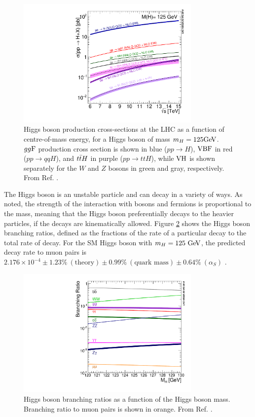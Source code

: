 \begin{figure}[h]
  \centering
  \includegraphics[width=0.8\textwidth]{figures/theory/HiggsProduction}
  \caption[Higgs boson production cross-sections at the LHC.]{Higgs boson production
  cross-sections at the LHC as a function of centre-of-mass energy, for a Higgs boson
  of mass $m_H = 125 \text{Ge\kern -0.1em V}$. $gg\text{F}$ production cross section is shown in blue
  ($pp \rightarrow H$), $\text{VBF}$ in red ($pp \rightarrow qqH$), and $t\bar{t} H$ in purple
  ($pp \rightarrow ttH$), while $\text{VH}$ is shown separately for the $W$ and $Z$ bosons
  in green and gray, respectively. From Ref. \cite{deFlorian:2016spz}.}
   \label{fig:the:prod}
\end{figure}

The Higgs boson is an unstable particle and can decay in a variety of ways. As noted,
the strength of the interaction with bosons and fermions is proportional to the mass,
meaning that the Higgs boson preferentially decays to the heavier particles, if the decays
are kinematically allowed. Figure \ref{fig:the:decay} shows the Higgs boson branching
ratios, defined as the fractions of the rate of a particular decay to the total
rate of decay. For the SM Higgs boson with $m_H = 125~\text{Ge\kern -0.1em V}$, the predicted decay rate to muon pairs
is $2.176 \times 10^{-4}
\pm 1.23\%~(\text{theory})
\pm 0.99\%~(\text{quark mass})
\pm 0.64\%~(\alpha_S)$ \cite{deFlorian:2016spz}. 

\begin{figure}[h]
  \centering
  \includegraphics[width=0.8\textwidth]{figures/theory/HiggsDecay}
  \caption[Higgs boson branching ratios.]{Higgs boson branching ratios as a function
  of the Higgs boson mass. Branching ratio to muon pairs is shown in orange.
  From Ref. \cite{deFlorian:2016spz}.}
   \label{fig:the:decay}
\end{figure}

